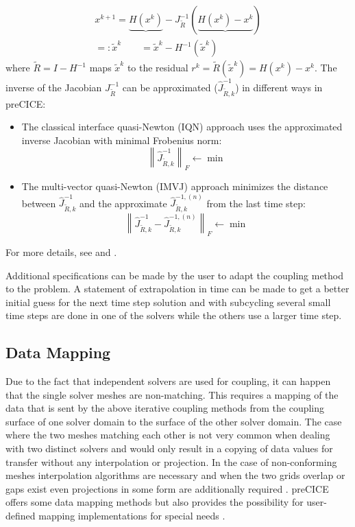    \begin{align}
   x^{k+1} = \underbrace{H(x^k)} - J_{\tilde{R}}^{-1}\left( \underbrace{H(x^k) - x^k}\right) \\
   =: \tilde{x}^k\qquad =\tilde{x}^k - H^{-1}(\tilde{x}^k) \nonumber
   \end{align}
   where $\tilde{R} = I-H^{-1}$ maps $\tilde{x}^k$ to the residual $r^k=\tilde{R}(\tilde{x}^k)=H(x^k)-x^k$. The inverse of the Jacobian $J_{\tilde{R}}^{-1}$ can be approximated ($\hat{J}_{\tilde{R},k}^{-1}$) in different ways in preCICE:
   \begin{itemize}
   	\item The classical interface quasi-Newton (IQN) approach uses the approximated inverse Jacobian with minimal Frobenius norm:
   	\begin{equation}
   	\left\| \hat{J}_{\tilde{R},k}^{-1} \right\|_F \leftarrow \min
   	\end{equation}
   	\item The multi-vector quasi-Newton (IMVJ) approach minimizes the distance between $\hat{J}_{\tilde{R},k}^{-1}$ and the approximate $\hat{J}_{\tilde{R},k}^{-1,(n)}$ from the last time step:
   	\begin{equation}
   	\left\| \hat{J}_{\tilde{R},k}^{-1} - \hat{J}_{\tilde{R},k}^{-1,(n)}\right\|_F \leftarrow \min
   	\end{equation}
   \end{itemize}
   For more details, see \cite{bungartz2015fully} and \cite{gatzhammer2015efficient}.
   
   Additional specifications can be made by the user to adapt the coupling method to the problem. A statement of extrapolation in time can be made to get a better initial guess for the next time step solution and with subcycling several small time steps are done in one of the solvers while the others use a larger time step.
  

 \subsection{Data Mapping} \label{sec:Coupl-DataMapping}
  Due to the fact that independent solvers are used for coupling, it can happen that the single solver meshes are non-matching. This requires a mapping of the data that is sent by the above iterative coupling methods from the coupling surface of one solver domain to the surface of the other solver domain. The case where the two meshes matching each other is not very common when dealing with two distinct solvers and would only result in a copying of data values for transfer without any interpolation or projection. In the case of non-conforming meshes interpolation algorithms are necessary and when the two grids overlap or gaps exist even projections in some form are additionally required \cite{gatzhammer2015efficient}. preCICE offers some data mapping methods but also provides the possibility for user-defined mapping implementations for special needs \cite{bungartz2015fully}.

